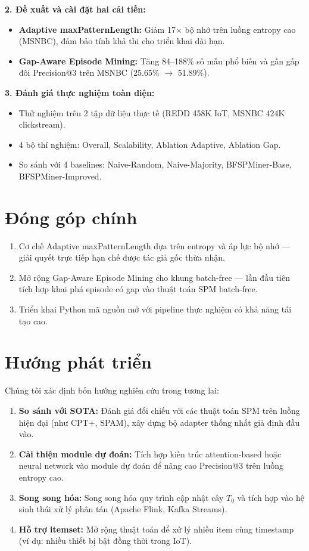 \documentclass[14pt,a4paper,oneside]{extreport}
\begin{document}
\textbf{2. Đề xuất và cài đặt hai cải tiến:}
\begin{itemize}
    \item \textbf{Adaptive maxPatternLength:} Giảm 17$\times$ bộ nhớ trên luồng entropy cao (MSNBC), đảm bảo tính khả thi cho triển khai dài hạn.
    \item \textbf{Gap-Aware Episode Mining:} Tăng 84--188\% số mẫu phổ biến và gần gấp đôi Precision@3 trên MSNBC (25.65\% $\rightarrow$ 51.89\%).
\end{itemize}

\textbf{3. Đánh giá thực nghiệm toàn diện:}
\begin{itemize}
    \item Thử nghiệm trên 2 tập dữ liệu thực tế (REDD 458K IoT, MSNBC 424K clickstream).
    \item 4 bộ thí nghiệm: Overall, Scalability, Ablation Adaptive, Ablation Gap.
    \item So sánh với 4 baselines: Naive-Random, Naive-Majority, BFSPMiner-Base, BFSPMiner-Improved.
\end{itemize}

\section{Đóng góp chính}
\begin{enumerate}
    \item Cơ chế Adaptive maxPatternLength dựa trên entropy và áp lực bộ nhớ --- giải quyết trực tiếp hạn chế được tác giả gốc thừa nhận.
    \item Mở rộng Gap-Aware Episode Mining cho khung batch-free --- lần đầu tiên tích hợp khai phá episode có gap vào thuật toán SPM batch-free.
    \item Triển khai Python mã nguồn mở với pipeline thực nghiệm có khả năng tái tạo cao.
\end{enumerate}

\section{Hướng phát triển}
Chúng tôi xác định bốn hướng nghiên cứu trong tương lai:

\begin{enumerate}
    \item \textbf{So sánh với SOTA:} Đánh giá đối chiếu với các thuật toán SPM trên luồng hiện đại (như CPT+, SPAM), xây dựng bộ adapter thống nhất giả định đầu vào.
    \item \textbf{Cải thiện module dự đoán:} Tích hợp kiến trúc attention-based hoặc neural network vào module dự đoán để nâng cao Precision@3 trên luồng entropy cao.
    \item \textbf{Song song hóa:} Song song hóa quy trình cập nhật cây $T_0$ và tích hợp vào hệ sinh thái xử lý phân tán (Apache Flink, Kafka Streams).
    \item \textbf{Hỗ trợ itemset:} Mở rộng thuật toán để xử lý nhiều item cùng timestamp (ví dụ: nhiều thiết bị bật đồng thời trong IoT).
\end{enumerate}
\end{document}
